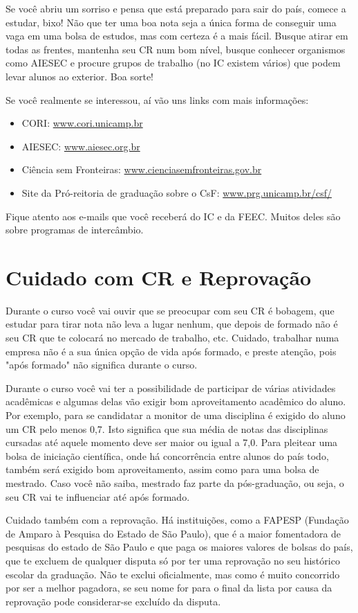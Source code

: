 Se você abriu um sorriso e pensa que está preparado para sair do país,
comece a estudar, bixo! Não que ter uma boa nota seja a única forma de
conseguir uma vaga em uma bolsa de estudos, mas com certeza é a mais fácil.
Busque atirar em todas as frentes, mantenha seu CR num bom nível, busque
conhecer organismos como AIESEC e procure grupos de trabalho (no IC existem
vários) que podem levar alunos ao exterior. Boa sorte!

Se você realmente se interessou, aí vão uns links com mais informações:

\begin{itemize}
\item  CORI: \url{www.cori.unicamp.br}
\item  AIESEC: \url{www.aiesec.org.br}
\item  Ciência sem Fronteiras: \url{www.cienciasemfronteiras.gov.br}
\item  Site da Pró-reitoria de graduação sobre o CsF: \url{www.prg.unicamp.br/csf/}
\end{itemize}

Fique atento aos e-mails que você receberá do IC e da FEEC. Muitos deles são sobre programas de intercâmbio.

\section{Cuidado com CR e Reprovação}

Durante o curso você vai ouvir que se preocupar com seu CR é bobagem, que
estudar para tirar nota não leva a lugar nenhum, que depois de formado não é seu
CR que te colocará no mercado de trabalho, etc. Cuidado, trabalhar numa empresa não
é a sua única opção de vida após formado, e preste atenção, pois "após formado"
não significa durante o curso.

Durante o curso você vai ter a possibilidade de participar de várias atividades
acadêmicas e algumas delas vão exigir bom aproveitamento acadêmico do aluno. Por
exemplo, para se candidatar a monitor de uma disciplina é exigido do aluno um CR
pelo menos 0,7. Isto significa que sua média de notas das disciplinas cursadas até
aquele momento deve ser maior ou igual a 7,0. Para pleitear uma bolsa de
iniciação científica, onde há concorrência entre alunos do país todo, também
será exigido bom aproveitamento, assim como para uma bolsa de mestrado. Caso
você não saiba, mestrado faz parte da pós-graduação, ou seja, o seu CR vai te
influenciar até após formado.

Cuidado também com a reprovação. Há instituições, como a FAPESP (Fundação de
Amparo à Pesquisa do Estado de São Paulo), que é a maior fomentadora de pesquisas
do estado de São Paulo e que paga os maiores valores de bolsas do país, que te
excluem de qualquer disputa só por ter uma reprovação no seu histórico escolar da
graduação. Não te exclui oficialmente, mas como é muito concorrido por ser
a melhor pagadora, se seu nome for para o final da lista por causa da reprovação
pode considerar-se excluído da disputa.

